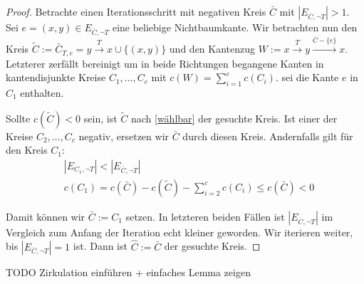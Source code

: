 \begin{proof}
Betrachte einen Iterationsschritt mit negativen Kreis $\bar{C}$ mit $|E_{\bar{C},\neg T}|>1$. Sei $e=(x,y)\in E_{\bar{C},\neg T}$ eine beliebige Nichtbaumkante. Wir betrachten nun den Kreis $\tilde{C}:=\bar{C}_{T,e}=y\xrightarrow{T}x\cup\{(x,y)\}$ und den Kantenzug $W:=x\xrightarrow{T}y\xrightarrow{\bar{C}-\{e\}}x$. Letzterer zerfällt bereinigt um in beide Richtungen begangene Kanten in kantendisjunkte Kreise $C_1,\ldots,C_c$ mit $c(W)=\sum_{i=1}^{c} c(C_i)$. \Obda sei die Kante $e$ in $C_1$ enthalten.

Sollte $c(\tilde{C})<0$ sein, ist $\tilde{C}$ nach \cref{wählbar} der gesuchte Kreis. Ist einer der Kreise $C_2,\ldots,C_c$ negativ, ersetzen wir $\bar{C}$ durch diesen Kreis. Andernfalls gilt für den Kreis $C_1$:
\begin{align*}
&|E_{C_1,\neg T}|<|E_{\bar{C},\neg T}| \\
&c(C_1)=c(\bar{C})-c(\tilde{C})-\sum_{i=2}^{c}c(C_i)\leq c(\bar{C})<0
\end{align*}

Damit können wir $\bar{C}:=C_1$ setzen. In letzteren beiden Fällen ist $|E_{\bar{C},\neg T}|$ im Vergleich zum Anfang der Iteration echt kleiner geworden. Wir iterieren weiter, bis $|E_{\bar{C},\neg T}|=1$ ist. Dann ist $\hat{C}:=\bar{C}$ der gesuchte Kreis.\end{proof}

TODO Zirkulation einführen + einfaches Lemma zeigen

